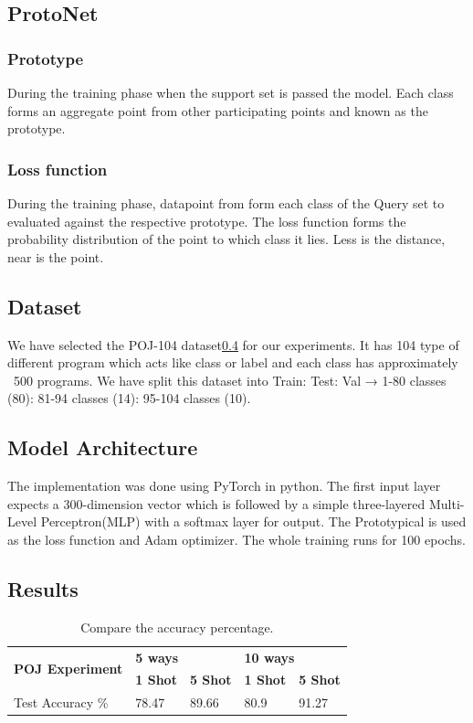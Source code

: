 \subsection{ProtoNet}
\subsubsection{Prototype}
During the training phase when the support set is passed the model. Each class forms an aggregate point from other participating points and known as the prototype.
 
\subsubsection{Loss function}
During the training phase, datapoint from form each class of the Query set to evaluated against the respective prototype. The loss function forms the probability distribution of the point to which class it lies. Less is the distance, near is the point.
    		           

\subsection{Dataset}
We have selected the POJ-104 dataset\ref{} for our experiments. It has 104 type of different program which acts like class or label and each class has approximately ~500 programs. We have split this dataset into Train: Test: Val →  1-80 classes (80): 81-94 classes (14): 95-104 classes (10).

\subsection{Model Architecture}
The implementation was done using PyTorch in python. The first input layer expects a 300-dimension vector which is followed by a simple three-layered Multi-Level Perceptron(MLP) with a softmax layer for output. The Prototypical is used as the loss function and Adam optimizer. The whole training runs for 100 epochs.

\subsection{Results}

\begin{table}[h]
\begin{tabular}{lllll}
\hline
\multirow{2}{*}{\textbf{POJ Experiment}} & \multicolumn{2}{l}{\textbf{5 ways}} & \multicolumn{2}{l}{\textbf{10 ways}} \\
 & \textbf{1 Shot} & \textbf{5 Shot} & \textbf{1 Shot} & \textbf{5 Shot} \\
\hline
Test Accuracy \% & 78.47 & 89.66 & 80.9 & 91.27 \\
\hline
\end{tabular}
\centering
\caption{Compare the accuracy percentage.}
\label{unsupervised-acc}
\end{table}